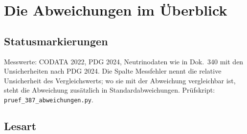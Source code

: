 
\providecommand{\BM}{\textbf{[B]}}
\providecommand{\KM}{\textbf{[K]}}
\providecommand{\SM}{\textbf{[S]}}
\providecommand{\XM}{\textbf{[X]}}
\providecommand{\QM}{\textbf{[Q]}}

\chapter*{Die Abweichungen im Überblick}

\begin{abstract}
Dieses Dokument hält alle Restabweichungen der FFGFT an einer Stelle fest, jeweils mit dem
Messwert und seiner Unsicherheit. Es folgt der Ordnung der Theorie: zuerst die Verhältnisse der
Grundform in natürlichen Einheiten mit $\alpha=1$, dann die Übersetzung in SI. Die Verhältnisse
treffen auf Promille bis wenige Prozent; die Messunsicherheiten sind dabei fast überall um
Größenordnungen kleiner als die Abweichungen und tragen nur einen minimalen Betrag bei. Drei
Korrekturgrößen tragen die Reste: die Higgs-Korrektur $\beta_T$, die schon in den frühesten
Dokumenten von 2025 als kleine Abweichung von $\beta_T=1$ stand, die fraktale Korrektur
$K_{\text{frak}}=74/75$ der SI-Übersetzung und der Faktor~10 in $v/E_P$. Für jede wird gezeigt,
welche Varianten es gibt, wie gut sie passen und welche Zusammenhänge sich ergeben.
\end{abstract}

\section*{Statusmarkierungen}

Messwerte: CODATA 2022, PDG 2024, Neutrinodaten wie in Dok.~340 mit den Unsicherheiten nach PDG 2024. Die Spalte
\glqq Messfehler\grqq{} nennt die relative Unsicherheit des Vergleichswerts; wo sie mit der
Abweichung vergleichbar ist, steht die Abweichung zusätzlich in Standardabweichungen.
Prüfskript: \texttt{pruef\_387\_abweichungen.py}.

\section{Lesart}

